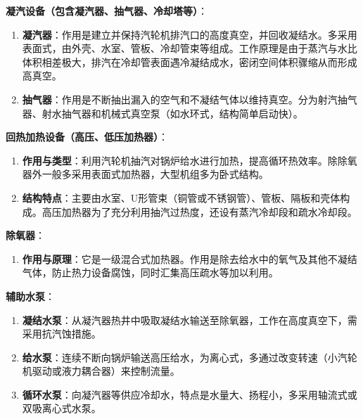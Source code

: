 \begin{solution}
\textbf{凝汽设备（包含凝汽器、抽气器、冷却塔等）}：
\begin{enumerate}
  \item \textbf{凝汽器}：作用是建立并保持汽轮机排汽口的高度真空，并回收凝结水。多采用表面式，由外壳、水室、管板、冷却管束等组成。工作原理是由于蒸汽与水比体积相差极大，排汽在冷却管表面遇冷凝结成水，密闭空间体积骤缩从而形成高真空。
  \item \textbf{抽气器}：作用是不断抽出漏入的空气和不凝结气体以维持真空。分为射汽抽气器、射水抽气器和机械式真空泵（如水环式，结构简单启动快）。
\end{enumerate}

\textbf{回热加热设备（高压、低压加热器）}：
\begin{enumerate}
  \item \textbf{作用与类型}：利用汽轮机抽汽对锅炉给水进行加热，提高循环热效率。除除氧器外一般多采用表面式加热器，大型机组多为卧式结构。
  \item \textbf{结构特点}：主要由水室、U形管束（铜管或不锈钢管）、管板、隔板和壳体构成。高压加热器为了充分利用抽汽过热度，还设有蒸汽冷却段和疏水冷却段。
\end{enumerate}

\textbf{除氧器}：
\begin{enumerate}
  \item \textbf{作用与原理}：它是一级混合式加热器。作用是除去给水中的氧气及其他不凝结气体，防止热力设备腐蚀，同时汇集高压疏水等加以利用。
\end{enumerate}

\textbf{辅助水泵}：
\begin{enumerate}
  \item \textbf{凝结水泵}：从凝汽器热井中吸取凝结水输送至除氧器，工作在高度真空下，需采用抗汽蚀措施。
  \item \textbf{给水泵}：连续不断向锅炉输送高压给水，为离心式，多通过改变转速（小汽轮机驱动或液力耦合器）来控制流量。
  \item \textbf{循环水泵}：向凝汽器等供应冷却水，特点是水量大、扬程小，多采用轴流式或双吸离心式水泵。
\end{enumerate}
\end{solution}
